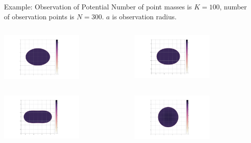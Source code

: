 \documentclass[dvipdfmx]{beamer}
\theoremstyle{remark}
\begin{document}
\begin{frame}{Example: Observation of Potential}
  Number of point masses is $K=100$, number of observation points is $N=300$.
  $a$ is observation radius.

  \begin{columns}
    \begin{column}{0.38\columnwidth}
      \setcounter{figure}{5}
      \centering
      \includegraphics[width=4cm]{fig/elliptic.png}
      \captionsetup[figure]{labelformat=empty,labelsep=none}
    \end{column}
    \hspace{-1cm}
    \begin{column}{0.38\columnwidth}
      \setcounter{figure}{9}
      \centering
      \includegraphics[width=4cm]{fig2/PN300K100R10E2.png}
      \captionsetup[figure]{labelformat=empty,labelsep=none}
    \end{column}
  \end{columns}

  \begin{columns}
    \begin{column}{0.38\columnwidth}
      \centering
      \includegraphics[width=4cm]{fig2/PN300K100R30E2.png}
      \captionsetup[figure]{labelformat=empty,labelsep=none}
    \end{column}
    \hspace{-1cm}
    \begin{column}{0.38\columnwidth}
      \centering
      \includegraphics[width=4cm]{fig3/PN300K100R200E2.png}
      \captionsetup[figure]{labelformat=empty,labelsep=none}
    \end{column}
  \end{columns}

\end{frame}
\end{document}

